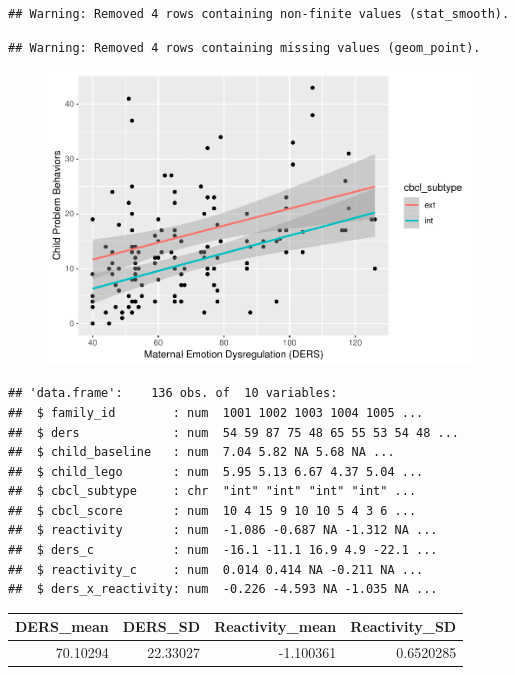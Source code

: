 \documentclass[man]{apa6}
\begin{document}
\begin{verbatim}
## Warning: Removed 4 rows containing non-finite values (stat_smooth).
\end{verbatim}

\begin{verbatim}
## Warning: Removed 4 rows containing missing values (geom_point).
\end{verbatim}

\begin{figure}
\centering
\includegraphics{DataPrepScript_apa_style_files/figure-latex/descriptives-1.pdf}
\caption{}
\end{figure}

\begin{verbatim}
## 'data.frame':    136 obs. of  10 variables:
##  $ family_id        : num  1001 1002 1003 1004 1005 ...
##  $ ders             : num  54 59 87 75 48 65 55 53 54 48 ...
##  $ child_baseline   : num  7.04 5.82 NA 5.68 NA ...
##  $ child_lego       : num  5.95 5.13 6.67 4.37 5.04 ...
##  $ cbcl_subtype     : chr  "int" "int" "int" "int" ...
##  $ cbcl_score       : num  10 4 15 9 10 10 5 4 3 6 ...
##  $ reactivity       : num  -1.086 -0.687 NA -1.312 NA ...
##  $ ders_c           : num  -16.1 -11.1 16.9 4.9 -22.1 ...
##  $ reactivity_c     : num  0.014 0.414 NA -0.211 NA ...
##  $ ders_x_reactivity: num  -0.226 -4.593 NA -1.035 NA ...
\end{verbatim}

\begin{tabular}{rrrr}
\toprule
DERS\_mean & DERS\_SD & Reactivity\_mean & Reactivity\_SD\\
\midrule
70.10294 & 22.33027 & -1.100361 & 0.6520285\\
\bottomrule
\end{tabular}
\end{document}
